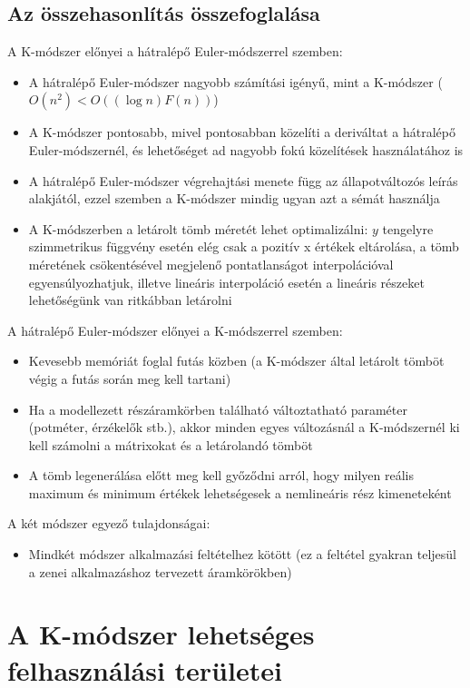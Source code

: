 \section{Az összehasonlítás összefoglalása}
A K-módszer előnyei a hátralépő Euler-módszerrel szemben:
\begin{itemize}
    \item A hátralépő Euler-módszer nagyobb számítási igényű, mint a K-módszer ($O(n^2) < O((\log{n})F(n))$)
    \item A K-módszer pontosabb, mivel pontosabban közelíti a deriváltat a hátralépő Euler-módszernél, és lehetőséget ad nagyobb fokú közelítések használatához is
    \item A hátralépő Euler-módszer végrehajtási menete függ az állapotváltozós leírás alakjától, ezzel szemben a K-módszer mindig ugyan azt a sémát használja
    \item A K-módszerben a letárolt tömb méretét lehet optimalizálni: $y$ tengelyre szimmetrikus függvény esetén elég csak a pozitív x értékek eltárolása, a tömb méretének csökentésével megjelenő pontatlanságot interpolációval egyensúlyozhatjuk, illetve lineáris interpoláció esetén a lineáris részeket lehetőségünk van ritkábban letárolni
\end{itemize}
A hátralépő Euler-módszer előnyei a K-módszerrel szemben:
\begin{itemize}
    \item Kevesebb memóriát foglal futás közben (a K-módszer által letárolt tömböt végig a futás során meg kell tartani)
    \item Ha a modellezett részáramkörben található változtatható paraméter (potméter, érzékelők stb.), akkor minden egyes változásnál a K-módszernél ki kell számolni a mátrixokat és a letárolandó tömböt
    \item A tömb legenerálása előtt meg kell győződni arról, hogy milyen reális maximum és minimum értékek lehetségesek a nemlineáris rész kimeneteként
\end{itemize}
A két módszer egyező tulajdonságai:
\begin{itemize}
    \item Mindkét módszer alkalmazási feltételhez kötött (ez a feltétel gyakran teljesül a zenei alkalmazáshoz tervezett áramkörökben)
\end{itemize}

\chapter{A K-módszer lehetséges felhasználási területei}